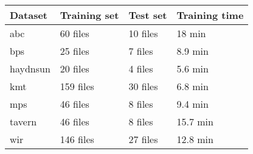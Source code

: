\begin{tabular}{l|lll}
Dataset        & Training set & Test set & Training time \\ \hline
\gls{abc}      & 60  files            & 10 files        & 18 min        \\
\gls{bps}      & 25  files            & 7  files        & 8.9 min       \\
\gls{haydnsun} & 20  files            & 4  files        & 5.6 min       \\
\gls{kmt}      & 159 files            & 30 files        & 6.8 min       \\
\gls{mps}      & 46  files            & 8  files        & 9.4 min       \\
\gls{tavern}   & 46  files            & 8  files        & 15.7 min      \\
\gls{wir}      & 146 files            & 27 files        & 12.8 min     
\end{tabular}
